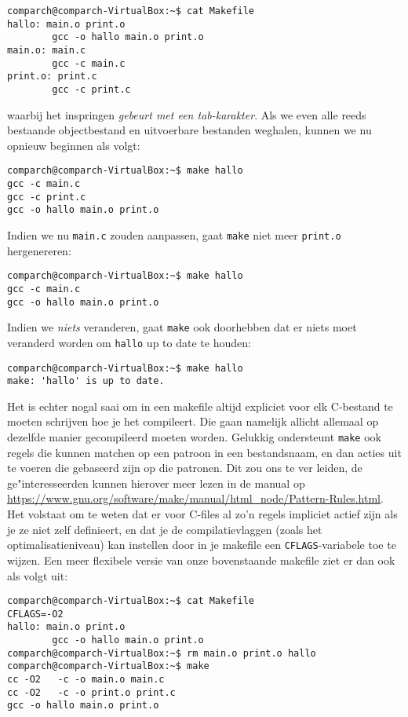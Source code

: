 \documentclass[a4paper,twoside,openany]{memoir}
\begin{document}
\begin{verbatim}
comparch@comparch-VirtualBox:~$ cat Makefile
hallo: main.o print.o
        gcc -o hallo main.o print.o
main.o: main.c
        gcc -c main.c
print.o: print.c
        gcc -c print.c
\end{verbatim}
waarbij het inspringen \emph{gebeurt met een tab-karakter}. Als we even alle
reeds bestaande objectbestand en uitvoerbare bestanden weghalen, kunnen we nu
opnieuw beginnen als volgt:

\begin{verbatim}
comparch@comparch-VirtualBox:~$ make hallo
gcc -c main.c
gcc -c print.c
gcc -o hallo main.o print.o
\end{verbatim}

Indien we nu \verb!main.c! zouden aanpassen, gaat \verb!make! niet meer
\verb!print.o! hergenereren:

\begin{verbatim}
comparch@comparch-VirtualBox:~$ make hallo 
gcc -c main.c
gcc -o hallo main.o print.o
\end{verbatim}

Indien we \emph{niets} veranderen, gaat  \verb!make! ook doorhebben dat er niets
moet veranderd worden om \verb!hallo! up to date te houden:
\begin{verbatim}
comparch@comparch-VirtualBox:~$ make hallo 
make: 'hallo' is up to date.
\end{verbatim}

Het is echter nogal saai om in een makefile altijd expliciet voor elk C-bestand
te moeten schrijven hoe je het compileert. Die gaan namelijk allicht allemaal op
dezelfde manier gecompileerd moeten worden. Gelukkig ondersteunt \verb!make! ook
regels die kunnen matchen op een patroon in een bestandsnaam, en dan acties uit
te voeren die gebaseerd zijn op die patronen. Dit zou ons te ver leiden, de
ge"interesseerden kunnen hierover meer lezen in de manual op
\url{https://www.gnu.org/software/make/manual/html_node/Pattern-Rules.html}. Het
volstaat om te weten dat er voor C-files al zo'n regels impliciet actief zijn
als je ze niet zelf definieert, en dat je de compilatievlaggen (zoals het
optimalisatieniveau) kan instellen door in je makefile een
\verb!CFLAGS!-variabele toe te wijzen. Een meer flexibele versie van onze
bovenstaande makefile ziet er dan ook als volgt uit:

\begin{verbatim}
comparch@comparch-VirtualBox:~$ cat Makefile 
CFLAGS=-O2
hallo: main.o print.o
        gcc -o hallo main.o print.o
comparch@comparch-VirtualBox:~$ rm main.o print.o hallo 
comparch@comparch-VirtualBox:~$ make
cc -O2   -c -o main.o main.c
cc -O2   -c -o print.o print.c
gcc -o hallo main.o print.o
\end{verbatim}
\end{document}

